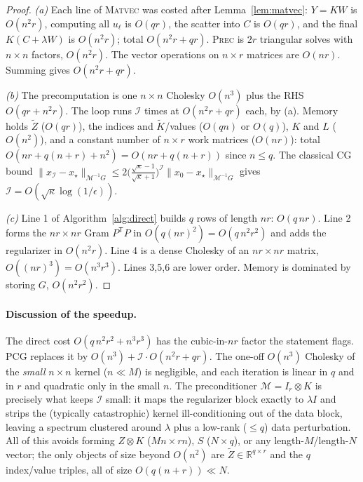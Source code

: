 \documentclass[12pt]{article}
\newcommand{\bR}{\mathbb{R}}
\begin{document}
\begin{proof}
\emph{(a)} Each line of \textsc{Matvec} was costed after Lemma~\ref{lem:matvec}:
$Y=KW$ is $O(n^2r)$, computing all $u_\ell$ is $O(qr)$, the scatter into $C$ is
$O(qr)$, and the final $K(C+\lambda W)$ is $O(n^2r)$; total $O(n^2r+qr)$.
\textsc{Prec} is $2r$ triangular solves with $n\times n$ factors, $O(n^2r)$. The
vector operations on $n\times r$ matrices are $O(nr)$. Summing gives $O(n^2r+qr)$.

\emph{(b)} The precomputation is one $n\times n$ Cholesky $O(n^3)$ plus the RHS
$O(qr+n^2r)$. The loop runs $\mathcal I$ times at $O(n^2r+qr)$ each, by (a).
Memory holds $\tilde Z$ ($O(qr)$), the indices and $\tilde K$/values ($O(qn)$ or
$O(q)$), $K$ and $L$ ($O(n^2)$), and a constant number of $n\times r$ work
matrices ($O(nr)$): total $O(nr+q(n+r)+n^2)=O(nr+q(n+r))$ since $n\le q$. The
classical CG bound
$\|x_{\mathcal I}-x_\star\|_{\mathcal M^{-1}G}\le
2\big(\tfrac{\sqrt\kappa-1}{\sqrt\kappa+1}\big)^{\mathcal I}\|x_0-x_\star\|_{\mathcal M^{-1}G}$
gives $\mathcal I=O(\sqrt\kappa\log(1/\epsilon))$.

\emph{(c)} Line 1 of Algorithm~\ref{alg:direct} builds $q$ rows of length $nr$:
$O(q\,nr)$. Line 2 forms the $nr\times nr$ Gram $P^{\mathsf T}P$ in
$O(q(nr)^2)=O(q\,n^2r^2)$ and adds the regularizer in $O(n^2r)$. Line 4 is a
dense Cholesky of an $nr\times nr$ matrix, $O((nr)^3)=O(n^3r^3)$. Lines 3,5,6 are
lower order. Memory is dominated by storing $G$, $O(n^2r^2)$.
\end{proof}

\paragraph{Discussion of the speedup.}
The direct cost $O(q\,n^2r^2+n^3r^3)$ has the cubic-in-$nr$ factor the statement
flags. PCG replaces it by $O(n^3)+\mathcal I\cdot O(n^2r+qr)$. The one-off
$O(n^3)$ Cholesky of the \emph{small} $n\times n$ kernel ($n\ll M$) is negligible,
and each iteration is linear in $q$ and in $r$ and quadratic only in the small
$n$. The preconditioner $\mathcal M=I_r\otimes K$ is precisely what keeps
$\mathcal I$ small: it maps the regularizer block exactly to $\lambda I$ and
strips the (typically catastrophic) kernel ill-conditioning out of the data
block, leaving a spectrum clustered around $\lambda$ plus a low-rank
($\le q$) data perturbation. All of this avoids forming $Z\otimes K$
($M n\times r n$), $S$ ($N\times q$), or any length-$M$/length-$N$ vector; the
only objects of size beyond $O(n^2)$ are $\tilde Z\in\bR^{q\times r}$ and the
$q$ index/value triples, all of size $O(q(n+r))\ll N$.
\end{document}
